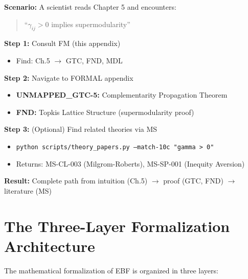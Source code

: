 \begin{tcolorbox}[colback=green!5!white, colframe=green!75!black,
    title=\textbf{Example Workflow: From Chapter to Proof}]

\textbf{Scenario:} A scientist reads Chapter 5 and encounters:
\begin{quote}
``$\gamma_{ij} > 0$ implies supermodularity''
\end{quote}

\textbf{Step 1:} Consult FM (this appendix)
\begin{itemize}[nosep]
    \item Find: Ch.5 $\rightarrow$ GTC, FND, MDL
\end{itemize}

\textbf{Step 2:} Navigate to FORMAL appendix
\begin{itemize}[nosep]
    \item \textbf{UNMAPPED_GTC-5:} Complementarity Propagation Theorem
    \item \textbf{FND:} Topkis Lattice Structure (supermodularity proof)
\end{itemize}

\textbf{Step 3:} (Optional) Find related theories via MS
\begin{itemize}[nosep]
    \item \texttt{python scripts/theory\_papers.py --match-10c "gamma > 0"}
    \item Returns: MS-CL-003 (Milgrom-Roberts), MS-SP-001 (Inequity Aversion)
\end{itemize}

\textbf{Result:} Complete path from intuition (Ch.5) $\rightarrow$ proof (GTC, FND) $\rightarrow$ literature (MS)

\end{tcolorbox}

\section{The Three-Layer Formalization Architecture}
\label{sec:fm-architecture}

The mathematical formalization of EBF is organized in three layers:

